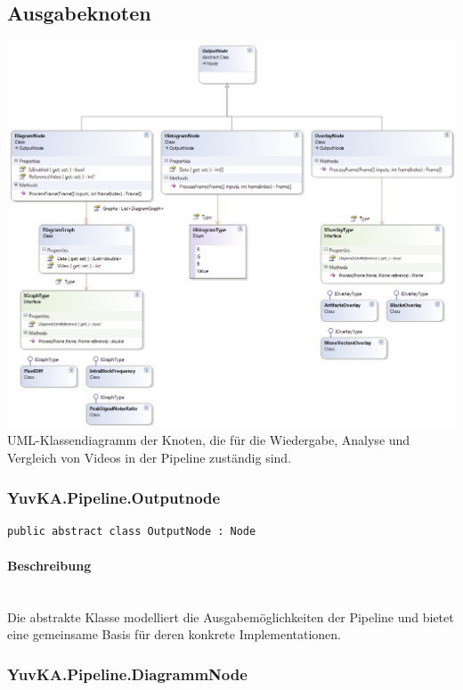 \subsection{Ausgabeknoten}

\includegraphics[width=\textwidth]{YuvKA.Pipeline/outputnodes.png}
UML-Klassendiagramm der Knoten, die für die Wiedergabe, Analyse und Vergleich von Videos in der Pipeline zuständig sind.

\subsubsection{YuvKA.Pipeline.Outputnode}

\begin{verbatim}
public abstract class OutputNode : Node
\end{verbatim}

\paragraph{Beschreibung}~\\
Die abstrakte Klasse  modelliert die Ausgabemöglichkeiten der Pipeline und bietet eine gemeinsame Basis für deren konkrete Implementationen.

\subsubsection{YuvKA.Pipeline.DiagrammNode}

